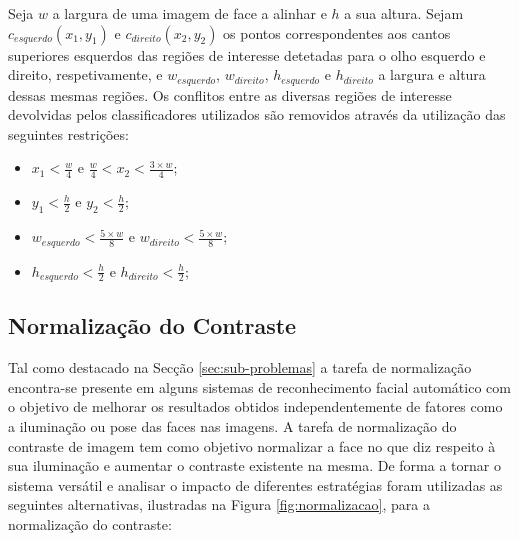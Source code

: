 Seja $w$ a largura de uma imagem de face a alinhar e $h$ a sua altura. Sejam $c_{esquerdo}(x_1,y_1)$ e  $c_{direito}(x_2,y_2)$  os pontos correspondentes aos cantos superiores esquerdos das regiões de interesse detetadas para o olho esquerdo e direito, respetivamente, e $w_{esquerdo}$, $w_{direito}$, $h_{esquerdo}$ e $h_{direito}$ a largura e altura dessas mesmas regiões. Os conflitos entre as diversas regiões de interesse devolvidas pelos classificadores utilizados são removidos através da utilização das seguintes restrições:

\begin{itemize}
\item $x_1 < \frac{w}{4}$ e $\frac{w}{4} < x_2 < \frac{3\times w}{4}$;
\item $y_1 < \frac{h}{2}$ e $y_2 < \frac{h}{2}$;
\item $w_{esquerdo} < \frac{5\times w}{8}$ e $w_{direito} < \frac{5\times w}{8}$;
\item $h_{esquerdo} < \frac{h}{2}$ e $h_{direito} < \frac{h}{2}$;
\end{itemize}

\subsection{Normalização do Contraste} \label{sec:normalizacao}

Tal como destacado na Secção \ref{sec:sub-problemas} a tarefa de normalização encontra-se presente em alguns sistemas de reconhecimento facial automático com o objetivo de melhorar os resultados obtidos independentemente de fatores como a iluminação ou pose das faces nas imagens. A tarefa de normalização do contraste de imagem tem como objetivo normalizar a face no que diz respeito à sua iluminação e aumentar o contraste existente na mesma. De forma a tornar o sistema versátil e analisar o impacto de diferentes estratégias foram utilizadas as seguintes alternativas, ilustradas na Figura \ref{fig:normalizacao}, para a normalização do contraste:

